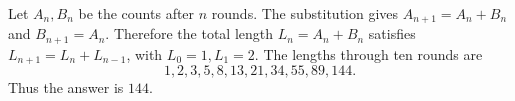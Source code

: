 Let $A_n,B_n$ be the counts after $n$ rounds. The substitution gives $A_{n+1}=A_n+B_n$ and $B_{n+1}=A_n$. Therefore the total length $L_n=A_n+B_n$ satisfies $L_{n+1}=L_n+L_{n-1}$, with $L_0=1,L_1=2$. The lengths through ten rounds are
\[
1,2,3,5,8,13,21,34,55,89,144.
\]
Thus the answer is $\boxed{144}$.
